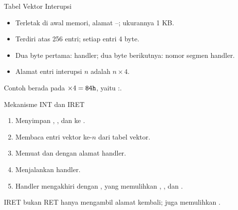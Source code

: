 \documentclass[aspectratio=169,11pt]{beamer}
\begin{document}
\begin{frame}{Tabel Vektor Interupsi}
\small
\begin{itemize}
    \item Terletak di awal memori, alamat --;
          ukurannya 1 KB.

    \vspace{0.18em}
    \item Terdiri atas 256 entri; setiap entri 4 byte.

    \vspace{0.18em}
    \item Dua byte pertama:  handler; dua byte berikutnya:
          nomor segmen handler.

    \vspace{0.18em}
    \item Alamat entri interupsi $n$ adalah $n \times 4$.
\end{itemize}

\vspace{0.25em}
\begin{block}{Contoh}
\small {} berada pada  $\times 4 = \texttt{84h}$,
yaitu :.
\end{block}
\end{frame}

\begin{frame}{Mekanisme INT dan IRET}
\small
\begin{enumerate}
    \item Menyimpan , , dan  ke
          .

    \vspace{0.15em}
    \item Membaca entri vektor ke-$n$ dari tabel vektor.

    \vspace{0.15em}
    \item Memuat  dan  dengan alamat handler.

    \vspace{0.15em}
    \item Menjalankan handler.

    \vspace{0.15em}
    \item Handler mengakhiri dengan , yang memulihkan
          , , dan .
\end{enumerate}

\vspace{0.2em}
\begin{alertblock}{IRET bukan RET}
\small {} hanya mengambil alamat kembali;  juga
memulihkan .
\end{alertblock}
\end{frame}
\end{document}
